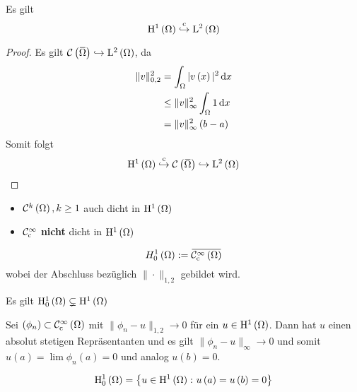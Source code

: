 \begin{lemma}
	Es gilt
	\begin{equation*}
		\H^{1}\left(\W\right)\cembed\L^{2}\left(\W\right)
	\end{equation*}
\end{lemma}
\newpage
\begin{proof}
	Es gilt $\C\left(\overbar{\W}\right)\hookrightarrow\L^{2}\left(\W\right)$, da
	\begin{align*}
		\|v\|_{0,2}^{2} &= \int_{\Omega}|v\left(x\right)|^{2}\,\mathrm{d} x\\
			&\leq \|v\|_{\infty}^{2}\int_{\Omega}1\,\mathrm{d} x\\
			&=\|v\|_{\infty}^{2}\left(b-a\right)
	\end{align*}
	Somit folgt
	\begin{equation*}
		\H^{1}\left(\W\right)\cembed\C\left(\overbar{\W}\right)\hookrightarrow\L^{2}\left(\W\right)
	\end{equation*}
\end{proof}
\begin{itemize}
	\item $\mathcal{C}^{k}\left(\Omega\right), k\geq 1$ auch dicht in $\mathrm{H}^{1}\left(\Omega\right)${}
	\item $\mathcal{C}^{\infty}_{\text{c}}$ \textbf{nicht} dicht in $\mathrm{H}^{1}\left(\Omega\right)$
\end{itemize}

\begin{definition}
	\begin{equation*}
		H^{1}_{0}\left(\W\right) := \overbar{\C^{\infty}_{\text{c}}\left(\W\right)}
	\end{equation*}
	wobei der Abschluss bezüglich $\|\cdot\|_{1,2}$ gebildet wird.
	
	Es gilt $\mathrm{H}^{1}_{0}\left(\Omega\right)\subsetneq\mathrm{H}^{1}\left(\Omega\right)${}
	
	Sei $\left(\phi_{n}\right)\subset\mathcal{C}^{\infty}_{\text{c}}\left(\Omega\right)$ mit $\|\phi_{n}-u\|_{1,2}\to 0$ für ein $u\in\mathrm{H}^{1}\left(\Omega\right)$. Dann hat $u$ einen absolut stetigen Repräsentanten und es gilt $\|\phi_{n}-u\|_{\infty}\to 0$ und somit $u\left(a\right)=\operatorname{lim}\phi_{n}\left(a\right)=0$ und analog $u\left(b\right)=0$.{}
\end{definition}

\begin{lemma}
	\begin{equation*}
		\mathrm{H}^{1}_{0}\left(\Omega\right) = \left\{u\in\mathrm{H}^{1}\left(\Omega\right)\colon u\left(a\right)=u\left(b\right)=0\right\}
	\end{equation*}
\end{lemma}


